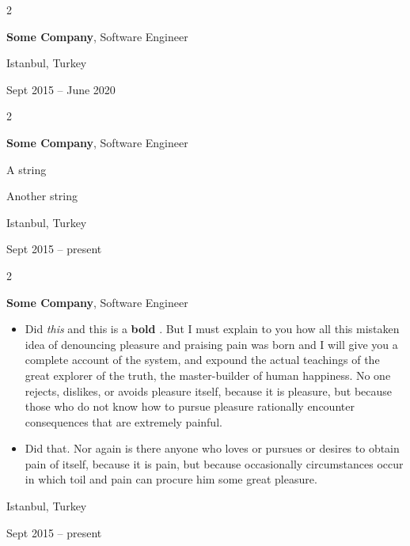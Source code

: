 \documentclass[10pt, letterpaper]{article}
\newenvironment{summary}{
    \begin{description}[
        topsep=0.10 cm,
        parsep=0.10 cm,
        partopsep=0pt,
        itemsep=0pt,
        leftmargin=0.4 cm + 10pt
    ]
}{
    \end{description}
} %
\newenvironment{highlights}{
    \begin{itemize}[
        topsep=0.10 cm,
        parsep=0.10 cm,
        partopsep=0pt,
        itemsep=0pt,
        leftmargin=0.4 cm + 10pt
    ]
}{
    \end{itemize}
} %
\newenvironment{twocolentry}[2][]{
    \onecolentry
    \def\secondColumn{#2}
    \setcolumnwidth{\fill, 4.5 cm}
    \begin{paracol}{2}
}{
    \switchcolumn \raggedleft \secondColumn
    \end{paracol}
    \endonecolentry
} %
\let\hrefWithoutArrow\href
\renewcommand{\href}[2]{\hrefWithoutArrow{#1}{\ifthenelse{\equal{#2}{}}{ }{#2 }\raisebox{.15ex}{\footnotesize \faExternalLink*}}}
\begin{document}
        \vspace{0.2 cm}

        \begin{twocolentry}{
            Istanbul, Turkey

        Sept 2015 – June 2020
        }
            \textbf{Some \textnormal{Company}}, Software Engineer
        \end{twocolentry}


        \vspace{0.2 cm}

        \begin{twocolentry}{
            Istanbul, Turkey

        Sept 2015 – present
        }
            \textbf{Some \textnormal{Company}}, Software Engineer
            \begin{summary}
                \item A string
                \item Another string
            \end{summary}
        \end{twocolentry}


        \vspace{0.2 cm}

        \begin{twocolentry}{
            Istanbul, Turkey

        Sept 2015 – present
        }
            \textbf{Some \textnormal{Company}}, Software Engineer
            \begin{highlights}
                \item Did \textit{this} and this is a \textbf{bold} \href{https://example.com}{link}. But I must explain to you how all this mistaken idea of denouncing pleasure and praising pain was born and I will give you a complete account of the system, and expound the actual teachings of the great explorer of the truth, the master-builder of human happiness. No one rejects, dislikes, or avoids pleasure itself, because it is pleasure, but because those who do not know how to pursue pleasure rationally encounter consequences that are extremely painful.
                \item Did that. Nor again is there anyone who loves or pursues or desires to obtain pain of itself, because it is pain, but because occasionally circumstances occur in which toil and pain can procure him some great pleasure.
            \end{highlights}
        \end{twocolentry}
\end{document}

